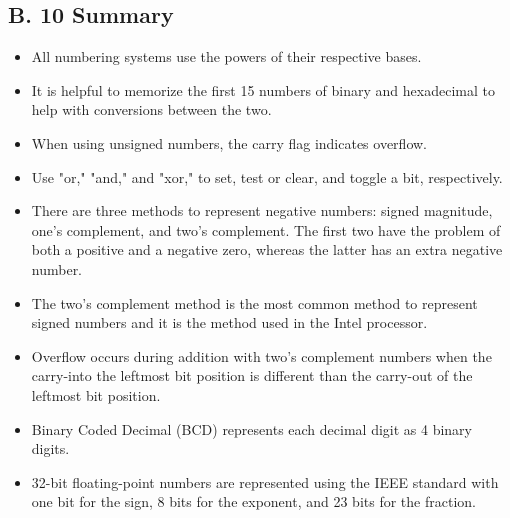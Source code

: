 \documentclass[10pt]{book}
\begin{document}
\begin{center}
\begin{center}
\begin{center}
\begin{center}
\begin{center}
\section*{B. 10 Summary}
\begin{itemize}
  \item All numbering systems use the powers of their respective bases.
  \item It is helpful to memorize the first 15 numbers of binary and hexadecimal to help with conversions between the two.
  \item When using unsigned numbers, the carry flag indicates overflow.
  \item Use "or," "and," and "xor," to set, test or clear, and toggle a bit, respectively.
  \item There are three methods to represent negative numbers: signed magnitude, one's complement, and two's complement. The first two have the problem of both a positive and a negative zero, whereas the latter has an extra negative number.
  \item The two's complement method is the most common method to represent signed numbers and it is the method used in the Intel processor.
  \item Overflow occurs during addition with two's complement numbers when the carry-into the leftmost bit position is different than the carry-out of the leftmost bit position.
  \item Binary Coded Decimal (BCD) represents each decimal digit as 4 binary digits.
  \item 32-bit floating-point numbers are represented using the IEEE standard with one bit for the sign, 8 bits for the exponent, and 23 bits for the fraction.
\end{itemize}


\end{center}
\end{center}
\end{center}
\end{center}
\end{center}
\end{document}
